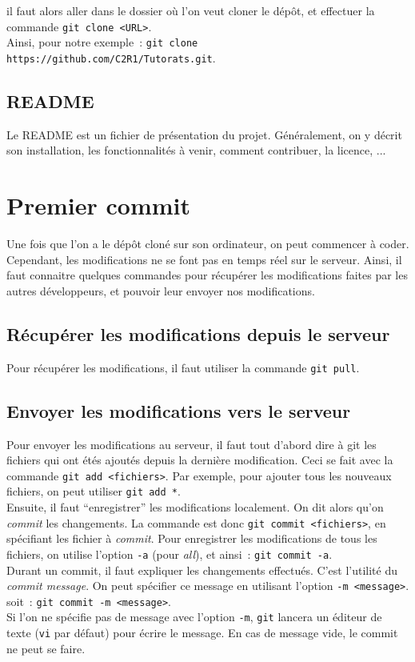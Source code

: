 \documentclass[a4paper,10pt]{report}
\begin{document}
il faut alors aller dans le dossier o\`u l'on veut cloner le d\'ep\^ot, et effectuer la commande \verb|git clone <URL>|.\\
Ainsi, pour notre exemple~: \verb|git clone https://github.com/C2R1/Tutorats.git|.

    \subsection{README}
Le README est un fichier de présentation du projet. Généralement, on y décrit son installation, les fonctionnalités à venir, comment contribuer, la licence, ...
  \section{Premier commit}
Une fois que l'on a le d\'ep\^ot clon\'e sur son ordinateur, on peut commencer \`a coder. Cependant, les modifications ne se font pas en temps r\'eel sur le serveur. Ainsi, il faut connaitre quelques commandes pour r\'ecup\'erer les modifications faites par les autres d\'eveloppeurs, et pouvoir leur envoyer nos modifications.
     \subsection{R\'ecup\'erer les modifications depuis le serveur}
Pour r\'ecup\'erer les modifications, il faut utiliser la commande \verb|git pull|.
     \subsection{Envoyer les modifications vers le serveur}
Pour envoyer les modifications au serveur, il faut tout d'abord dire \`a git les fichiers qui ont \'et\'es ajout\'es depuis la derni\`ere modification. Ceci se fait avec la commande \verb|git add <fichiers>|. Par exemple, pour ajouter tous les nouveaux fichiers, on peut utiliser \verb|git add *|.\\

Ensuite, il faut ``enregistrer'' les modifications localement. On dit alors qu'on \emph{commit} les changements. La commande est donc \verb|git commit <fichiers>|, en sp\'ecifiant les fichier \`a \emph{commit}. Pour enregistrer les modifications de tous les fichiers, on utilise l'option \verb|-a| (pour \emph{all}), et ainsi~: \verb|git commit -a|.\\
Durant un commit, il faut expliquer les changements effectu\'es. C'est l'utilit\'e du \emph{commit message}. On peut sp\'ecifier ce message en utilisant l'option \verb|-m <message>|. soit~: \verb|git commit -m <message>|.\\
Si l'on ne sp\'ecifie pas de message avec l'option \verb|-m|, \verb|git| lancera un \'editeur de texte (\verb|vi| par d\'efaut) pour \'ecrire le message. En cas de message vide, le commit ne peut se faire.\\
\end{document}
